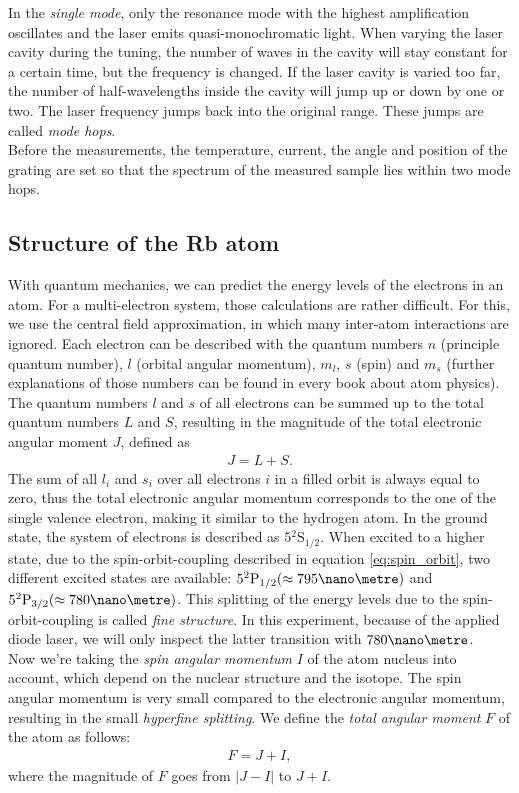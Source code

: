 In the \emph{single mode}, only the resonance mode with the highest amplification oscillates and the laser emits quasi-monochromatic light.
When varying the laser cavity during the tuning, the number of waves in the cavity will stay constant for a certain time, but the frequency is changed. If the laser cavity is varied too far, the number of half-wavelengths inside the cavity will jump up or down by one or two. The laser frequency jumps back into the original range. These jumps are called \emph{mode hops}.\\
Before the measurements, the temperature, current, the angle and position of the grating are set so that the spectrum of the measured sample lies within two mode hops.

\subsection{Structure of the Rb atom}
With quantum mechanics, we can predict the energy levels of the electrons in an atom. For a multi-electron system, those calculations are rather difficult. For this, we use the central field approximation, in which many inter-atom interactions are ignored. Each electron can be described with the quantum numbers $n$ (principle quantum number), $l$ (orbital angular momentum), $m_l$, $s$ (spin) and $m_s$ (further explanations of those numbers can be found in every book about atom physics). The quantum numbers $l$ and $s$ of all electrons can be summed up to the total quantum numbers $L$ and $S$, resulting in the magnitude of the total electronic angular moment $J$, defined as
\begin{align}
J=L+S.
\label{eq:spin_orbit}
\end{align}
The sum of all $l_i$ and $s_i$ over all electrons $i$ in a filled orbit is always equal to zero, thus the total electronic angular momentum corresponds to the one of the single valence electron, making it similar to the hydrogen atom. In the ground state, the system of electrons is described as $5{}^2\mathrm{S}_{1/2}$. When excited to a higher state, due to the spin-orbit-coupling described in equation \eqref{eq:spin_orbit}, two different excited states are available: $5{}^2\mathrm{P}_{1/2} (\approx 795 \nano\metre)$ and $5{}^2\mathrm{P}_{3/2} (\approx 780\nano\metre)$. This splitting of the energy levels due to the spin-orbit-coupling is called \emph{
fine structure}. In this experiment, because of the applied diode laser, we will only inspect the latter transition with $780\nano\metre$.\\
Now we're taking the \emph{spin angular momentum} $I$ of the atom nucleus into account, which depend on the nuclear structure and the isotope. The spin angular momentum is very small compared to the electronic angular momentum, resulting in the small \emph{hyperfine splitting}. We define the \emph{total angular moment} $F$ of the atom as follows:
\begin{align}
F=J+I,
\end{align}
where the magnitude of $F$ goes from $|J-I|$ to $J+I$.

